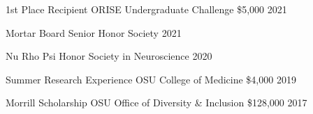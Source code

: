 

\begin{cvhonors}
 \cvhonor
    {1st Place Recipient} %
    {ORISE Undergraduate Challenge} %
    {\$5,000} %
    {2021} %

 \cvhonor
    {Mortar Board} %
    {Senior Honor Society} %
    {} %
    {2021} %

  \cvhonor
    {Nu Rho Psi} %
    {Honor Society in Neuroscience} %
    {} %
    {2020} %

  \cvhonor
    {Summer Research Experience} %
    {OSU College of Medicine} %
    {\$4,000} %
    {2019} %

  \cvhonor
    {Morrill Scholarship} %
    {OSU Office of Diversity \& Inclusion} %
    {\$128,000} %
    {2017} %


\end{cvhonors}
